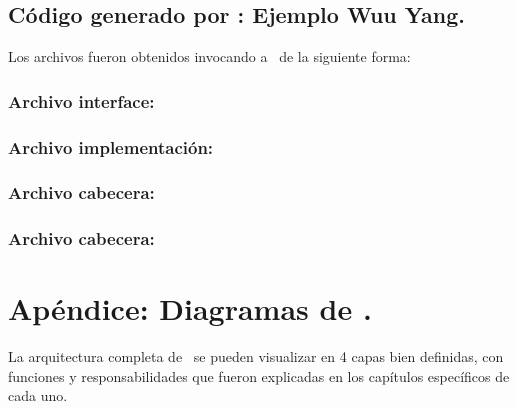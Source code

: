 \section{Código generado por \maggen: Ejemplo Wuu Yang.}
\label{append:agwuuyangcode}

Los archivos fueron obtenidos invocando a \maggen\ de la siguiente forma:

\begin{center}
\footnotesize{}
\end{center}

\subsection{Archivo interface: }
\label{append:maggenhpp}


\subsection{Archivo implementación: }
\label{append:maggencpp}


\subsection{Archivo cabecera: }
\label{append:nodehpp}


\subsection{Archivo cabecera: }
\label{append:planhpp}


\chapter{Apéndice: Diagramas de \maggen.}
\label{append:disemaggen}
La arquitectura completa de \maggen\ se pueden visualizar en 4 capas bien definidas, con funciones y responsabilidades que fueron explicadas en los capítulos específicos de cada uno.

